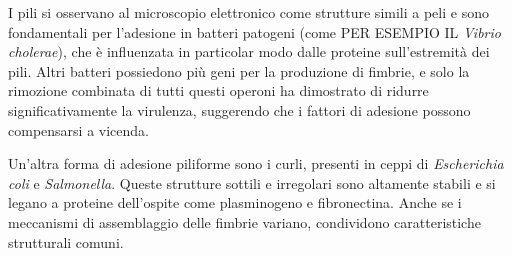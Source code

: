 \documentclass[../main.tex]{subfiles}
\begin{document}
I pili si osservano al microscopio elettronico come strutture simili a peli e sono fondamentali per l'adesione in batteri patogeni (come PER ESEMPIO IL \textit{Vibrio cholerae}), che è influenzata in particolar modo dalle proteine sull'estremità dei pili.\cite{fallman_2005} Altri batteri possiedono più geni per la produzione di fimbrie, e solo la rimozione combinata di tutti questi operoni ha dimostrato di ridurre significativamente la virulenza, suggerendo che i fattori di adesione possono compensarsi a vicenda.

Un'altra forma di adesione piliforme sono i curli, presenti in ceppi di \textit{Escherichia coli} e \textit{Salmonella}.\cite{kenny_1997} Queste strutture sottili e irregolari sono altamente stabili e si legano a proteine dell'ospite come plasminogeno e fibronectina. Anche se i meccanismi di assemblaggio delle fimbrie variano, condividono caratteristiche strutturali comuni.\cite{soto_1999}\smallskip
\end{document}
